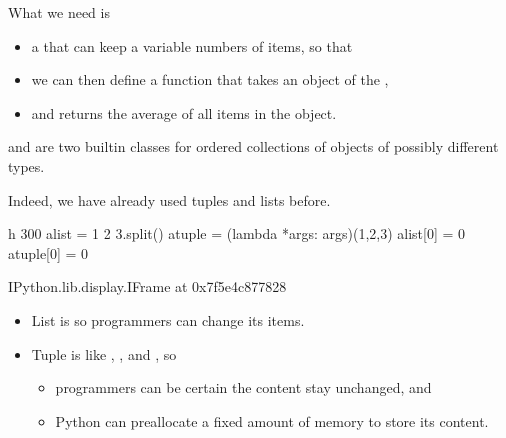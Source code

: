 \documentclass[letterpaper,10pt,english]{sphinxmanual}
\begin{document}
What we need is
\begin{itemize}
\item {} 
a  that can keep a variable numbers of items, so that

\item {} 
we can then define a function that takes an object of the ,

\item {} 
and returns the average of all items in the object.

\end{itemize}


 and  are two built\sphinxhyphen{}in classes for ordered collections of objects of possibly different types.

Indeed, we have already used tuples and lists before.

\begin{sphinxVerbatim}[commandchars=\\\{\}]
 \PYGZhy{}h 300
a\PYGZus{}list = \PYGZsq{}1 2 3\PYGZsq{}.split()
a\PYGZus{}tuple = (lambda *args: args)(1,2,3)
a\PYGZus{}list[0] = 0
a\PYGZus{}tuple[0] = 0
\end{sphinxVerbatim}

\begin{sphinxVerbatim}[commandchars=\\\{\}]
\PYGZlt{}IPython.lib.display.IFrame at 0x7f5e4c877828\PYGZgt{}
\end{sphinxVerbatim}

\begin{itemize}
\item {} 
List is  so programmers can change its items.

\item {} 
Tuple is  like , , and , so
\begin{itemize}
\item {} 
programmers can be certain the content stay unchanged, and

\item {} 
Python can preallocate a fixed amount of memory to store its content.

\end{itemize}

\end{itemize}
\end{document}

